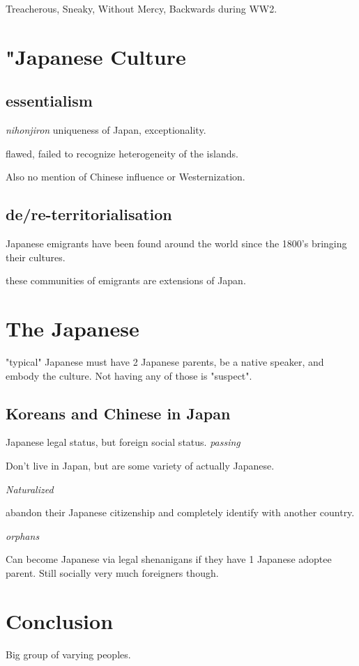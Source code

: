 \documentclass{report}
\begin{document}
Treacherous, Sneaky, Without Mercy, Backwards during WW2.

\section*{"Japanese Culture}
\subsection*{essentialism}
\textit{nihonjiron}
uniqueness of Japan, exceptionality.

flawed, failed to recognize heterogeneity of the islands. 

Also no mention of Chinese influence or Westernization. 

\subsection*{de/re-territorialisation}
Japanese emigrants have been found around the world since the 1800's bringing their cultures. 

these communities of emigrants are extensions of Japan. 

\section*{The Japanese}
"typical" Japanese must have 2 Japanese parents, be a native speaker, and embody the culture. Not having any of those is "suspect".

\subsection*{Koreans and Chinese in Japan}
Japanese legal status, but foreign social status. 
\textit{passing}

Don't live in Japan, but are some variety of actually Japanese.

\textit{Naturalized}

abandon their Japanese citizenship and completely identify with another country.

\textit{orphans}

Can become Japanese via legal shenanigans if they have 1 Japanese adoptee parent. Still socially very much foreigners though.

\section*{Conclusion}
Big group of varying peoples.
\end{document}
